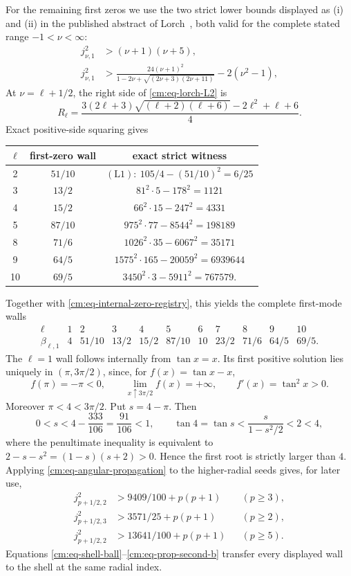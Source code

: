 \documentclass[11pt]{article}
\numberwithin{equation}{section}
\theoremstyle{definition}
\theoremstyle{remark}
\begin{document}
For the remaining first zeros we use the two strict lower bounds displayed
as (i) and (ii) in the published abstract of Lorch~\cite{Lorch1993}, both
valid for the complete stated range \(-1<\nu<\infty\):
\begin{align}
 j_{\nu,1}^2&>(\nu+1)(\nu+5), \tag{L1}\label{cm:eq-lorch-L1}\\
 j_{\nu,1}^2&>
 \frac{24(\nu+1)^2}
  {1-2\nu+\sqrt{(2\nu+3)(2\nu+11)}}-2(\nu^2-1),
 \tag{L2}\label{cm:eq-lorch-L2}
\end{align}
At \(\nu=\ell+1/2\), the right side of \eqref{cm:eq-lorch-L2} is
\[
 R_\ell=\frac{3(2\ell+3)\sqrt{(\ell+2)(\ell+6)}
 -2\ell^2+\ell+6}{4}.
\]
Exact positive-side squaring gives
\begin{center}
\small
\begin{tabular}{c|c|c}
\(\ell\)&first-zero wall&exact strict witness\\ \hline
2&\(51/10\)&\((\mathrm{L1}):\ 105/4-(51/10)^2=6/25\)\\
3&\(13/2\)&\(81^2\cdot5-178^2=1121\)\\
4&\(15/2\)&\(66^2\cdot15-247^2=4331\)\\
5&\(87/10\)&\(975^2\cdot77-8544^2=198189\)\\
8&\(71/6\)&\(1026^2\cdot35-6067^2=35171\)\\
9&\(64/5\)&\(1575^2\cdot165-20059^2=6939644\)\\
10&\(69/5\)&\(3450^2\cdot3-5911^2=767579\).
\end{tabular}
\end{center}
Together with \eqref{cm:eq-internal-zero-registry}, this yields the complete
first-mode walls
\begin{equation}
\begin{array}{c|cccccccccc}
\ell&1&2&3&4&5&6&7&8&9&10\\ \hline
\beta_{\ell,1}&4&51/10&13/2&15/2&87/10&10&23/2&71/6&64/5&69/5.
\end{array}
 \label{cm:eq-first-zero-table}
\end{equation}
The \(\ell=1\) wall follows internally from \(\tan x=x\).  Its first
positive solution lies uniquely in \((\pi,3\pi/2)\), since, for
\(f(x)=\tan x-x\),
\[
 f(\pi)=-\pi<0,\qquad
 \lim_{x\uparrow3\pi/2}f(x)=+\infty,\qquad
 f'(x)=\tan^2x>0.
\]
Moreover \(\pi<4<3\pi/2\).  Put \(s=4-\pi\).  Then
\[
 0<s<4-\frac{333}{106}=\frac{91}{106}<1,
 \qquad
 \tan4=\tan s<\frac{s}{1-s^2/2}<2<4,
\]
where the penultimate inequality is equivalent to
\(2-s-s^2=(1-s)(s+2)>0\).  Hence the first root is strictly larger
than \(4\).
Applying \eqref{cm:eq-angular-propagation} to the higher-radial seeds gives,
for later use,
\begin{align}
 j_{p+1/2,2}^2&>9409/100+p(p+1) &&(p\geq3),\label{cm:eq-prop-second-a}\\
 j_{p+1/2,3}^2&>3571/25+p(p+1) &&(p\geq2),\label{cm:eq-prop-third}\\
 j_{p+1/2,2}^2&>13641/100+p(p+1) &&(p\geq5).
 \label{cm:eq-prop-second-b}
\end{align}
Equations \eqref{cm:eq-shell-ball}--\eqref{cm:eq-prop-second-b} transfer
every displayed wall to the shell at the same radial index.
\end{document}
